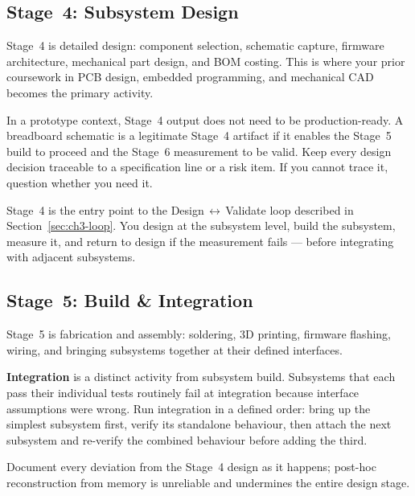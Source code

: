 \subsection{Stage~4: Subsystem Design}
\label{sec:ch3-stage4}

Stage~4 is detailed design: component selection, schematic capture, firmware
architecture, mechanical part design, and BOM costing.
This is where your prior coursework in PCB design, embedded programming, and
mechanical CAD becomes the primary activity.

In a prototype context, Stage~4 output does not need to be production-ready.
A breadboard schematic is a legitimate Stage~4 artifact if it enables the
Stage~5 build to proceed and the Stage~6 measurement to be valid.
Keep every design decision traceable to a specification line or a risk item.
If you cannot trace it, question whether you need it.

Stage~4 is the entry point to the Design\,$\leftrightarrow$\,Validate loop
described in Section~\ref{sec:ch3-loop}.
You design at the subsystem level, build the subsystem, measure it, and
return to design if the measurement fails --- before integrating with
adjacent subsystems.

\subsection{Stage~5: Build \& Integration}
\label{sec:ch3-stage5}

Stage~5 is fabrication and assembly: soldering, 3D printing, firmware
flashing, wiring, and bringing subsystems together at their defined
interfaces.

\textbf{Integration} is a distinct activity from
subsystem build.
Subsystems that each pass their individual tests routinely fail at
integration because interface assumptions were wrong.
Run integration in a defined order: bring up the simplest subsystem first,
verify its standalone behaviour, then attach the next subsystem and re-verify
the combined behaviour before adding the third.

Document every deviation from the Stage~4 design as it happens; post-hoc
reconstruction from memory is unreliable and undermines the entire design
stage.

